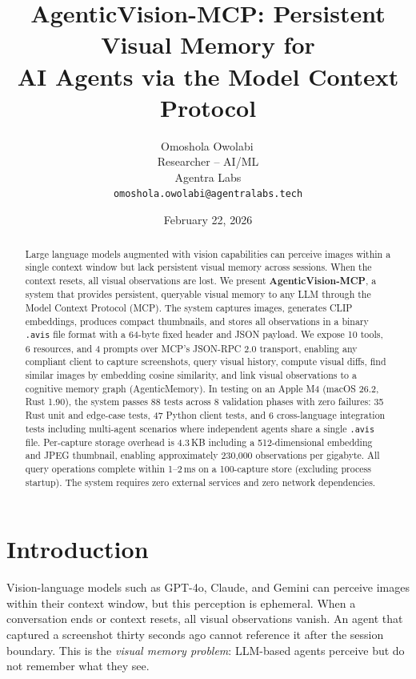 \documentclass[10pt, twocolumn]{article}
\title{\textbf{AgenticVision-MCP: Persistent Visual Memory for\\AI Agents via the Model Context Protocol}}
\author{Omoshola Owolabi\,\orcidlink{0009-0006-4089-0732}\\Researcher -- AI/ML\\Agentra Labs\\\texttt{omoshola.owolabi@agentralabs.tech}}
\date{February 22, 2026}
\begin{document}
\maketitle
\thispagestyle{fancy}

\begin{abstract}
Large language models augmented with vision capabilities can perceive images within a single context window but lack persistent visual memory across sessions. When the context resets, all visual observations are lost. We present \textbf{AgenticVision-MCP}, a system that provides persistent, queryable visual memory to any LLM through the Model Context Protocol (MCP). The system captures images, generates CLIP embeddings, produces compact thumbnails, and stores all observations in a binary \texttt{.avis} file format with a 64-byte fixed header and JSON payload. We expose 10 tools, 6 resources, and 4 prompts over MCP's JSON-RPC 2.0 transport, enabling any compliant client to capture screenshots, query visual history, compute visual diffs, find similar images by embedding cosine similarity, and link visual observations to a cognitive memory graph (AgenticMemory). In testing on an Apple M4 (macOS 26.2, Rust 1.90), the system passes 88 tests across 8 validation phases with zero failures: 35 Rust unit and edge-case tests, 47 Python client tests, and 6 cross-language integration tests including multi-agent scenarios where independent agents share a single \texttt{.avis} file. Per-capture storage overhead is 4.3\,KB including a 512-dimensional embedding and JPEG thumbnail, enabling approximately 230{,}000 observations per gigabyte. All query operations complete within 1--2\,ms on a 100-capture store (excluding process startup). The system requires zero external services and zero network dependencies.
\end{abstract}

\section{Introduction}

Vision-language models such as GPT-4o, Claude, and Gemini can perceive images within their context window, but this perception is ephemeral. When a conversation ends or context resets, all visual observations vanish. An agent that captured a screenshot thirty seconds ago cannot reference it after the session boundary. This is the \textit{visual memory problem}: LLM-based agents perceive but do not remember what they see.
\end{document}
